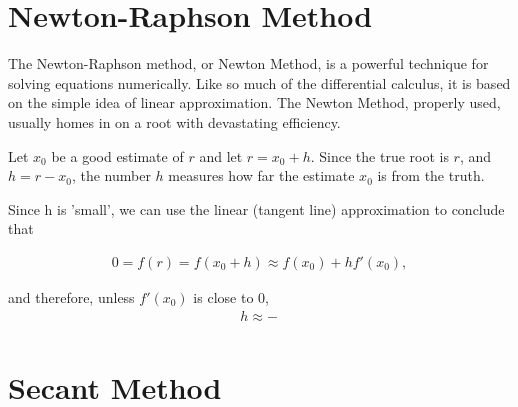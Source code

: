 \section{Newton-Raphson Method}
The Newton-Raphson method, or Newton Method, is a powerful technique
for solving equations numerically. Like so much of the differential calculus,
it is based on the simple idea of linear approximation. The Newton Method,
properly used, usually homes in on a root with devastating efficiency.

\par
Let $x_0$ be a good estimate of $r$ and let $r = x_0 + h$. 
Since the true root is $r$, and $h = r - x_0$, 
the number $h$ measures how far the estimate $x_0$ 
is from the truth.
\par
Since h is 'small', we can use the linear (tangent line) approximation to
conclude that

\begin{align*}
    0=f(r)=f(x_0+h)\approx f(x_0)+hf'(x_0),
\end{align*}

and therefore, unless $f'(x_0)$ is close to $0$,
\begin{align*}
    h\approx -\frac{}{}
\end{align*}


\section{Secant Method}

